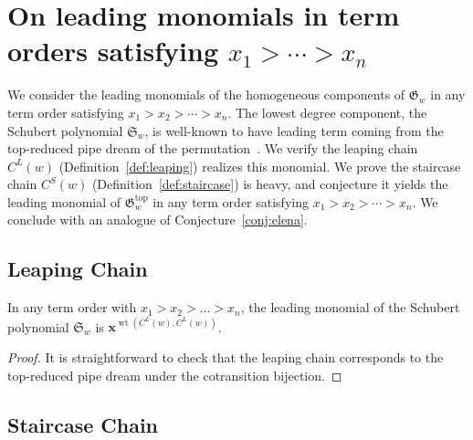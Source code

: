 \documentclass[ALCO]{cedram}
\DeclareMathOperator{\wt}{\mathrm{wt}}
\newcommand{\CL}{C^L}
\newcommand{\CS}{C^S}
\begin{document}
\section{On leading monomials in term orders satisfying \texorpdfstring{$x_1>\cdots>x_n$}{x1 > ... > xn}}
\label{sec:>}
We consider the leading monomials of the homogeneous components of $\mathfrak{G}_w$ in any term order satisfying $x_1>x_2>\cdots>x_n$. The lowest degree component, the Schubert polynomial $\mathfrak{S}_w$, is well-known to have leading term coming from the top-reduced pipe dream of the permutation~\cite{laddermoves}. We verify the leaping chain $\CL(w)$ (Definition~\ref{def:leaping}) realizes this monomial. We prove the staircase chain $\CS(w)$ (Definition~\ref{def:staircase}) is heavy, and conjecture it yields the leading monomial of $\mathfrak{G}_w^{\mathrm{top}}$ in any term order satisfying $x_1>x_2>\cdots>x_n$. We conclude with an analogue of Conjecture~\ref{conj:elena}.

\subsection{Leaping Chain}
\label{sec:leap}

\begin{theorem}
	\label{thm:leapingleading}
	In any term order with $x_1>x_2>\dots>x_n$, the leading monomial of the Schubert polynomial $\mathfrak{S}_w$ is $\bm{x}^{\wt(\CL(w),\CL(w))}$.
\end{theorem}
\begin{proof}
	It is straightforward to check that the leaping chain corresponds to the top-reduced pipe dream under the cotransition bijection.
\end{proof}

\subsection{Staircase Chain}
\label{sec:stair}
\end{document}
